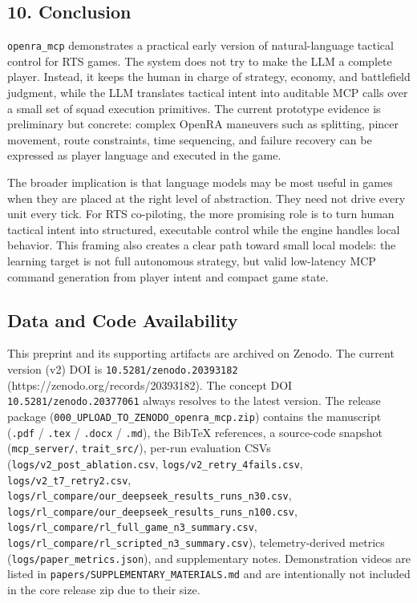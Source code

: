 \documentclass[
  journal]{IEEEtran}
\begin{document}
\subsection{10. Conclusion}\label{conclusion}

\texttt{openra\_mcp} demonstrates a practical early version of
natural-language tactical control for RTS games. The system does not try
to make the LLM a complete player. Instead, it keeps the human in charge
of strategy, economy, and battlefield judgment, while the LLM translates
tactical intent into auditable MCP calls over a small set of squad
execution primitives. The current prototype evidence is preliminary but
concrete: complex OpenRA maneuvers such as splitting, pincer movement,
route constraints, time sequencing, and failure recovery can be
expressed as player language and executed in the game.

The broader implication is that language models may be most useful in
games when they are placed at the right level of abstraction. They need
not drive every unit every tick. For RTS co-piloting, the more promising
role is to turn human tactical intent into structured, executable
control while the engine handles local behavior. This framing also
creates a clear path toward small local models: the learning target is
not full autonomous strategy, but valid low-latency MCP command
generation from player intent and compact game state.

\subsection{Data and Code
Availability}\label{data-and-code-availability}

This preprint and its supporting artifacts are archived on Zenodo. The
current version (v2) DOI is \texttt{10.5281/zenodo.20393182}
(https://zenodo.org/records/20393182). The concept DOI
\texttt{10.5281/zenodo.20377061} always resolves to the latest version.
The release package (\texttt{000\_UPLOAD\_TO\_ZENODO\_openra\_mcp.zip})
contains the manuscript (\texttt{.pdf} / \texttt{.tex} / \texttt{.docx}
/ \texttt{.md}), the BibTeX references, a source-code snapshot
(\texttt{mcp\_server/}, \texttt{trait\_src/}), per-run evaluation CSVs
(\texttt{logs/v2\_post\_ablation.csv},
\texttt{logs/v2\_retry\_4fails.csv}, \texttt{logs/v2\_t7\_retry2.csv},
\texttt{logs/rl\_compare/our\_deepseek\_results\_runs\_n30.csv},
\texttt{logs/rl\_compare/our\_deepseek\_results\_runs\_n100.csv},
\texttt{logs/rl\_compare/rl\_full\_game\_n3\_summary.csv},
\texttt{logs/rl\_compare/rl\_scripted\_n3\_summary.csv}),
telemetry-derived metrics (\texttt{logs/paper\_metrics.json}), and
supplementary notes. Demonstration videos are listed in
\texttt{papers/SUPPLEMENTARY\_MATERIALS.md} and are intentionally not
included in the core release zip due to their size.
\end{document}
